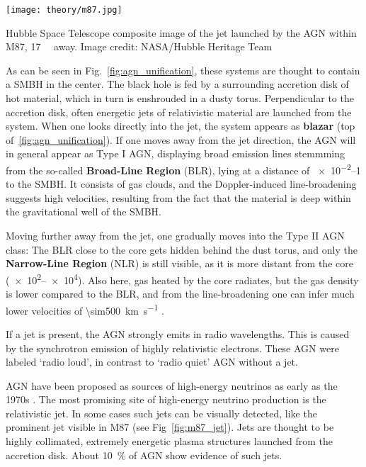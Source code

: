 \begin{marginfigure}
    \texttt{[image: theory/m87.jpg]}
    \caption[M87 jet]{Hubble Space Telescope composite image of the jet launched by the AGN within M87, \SI{17}{\mega\parsec} away. Image credit: NASA/Hubble Heritage Team}
\end{marginfigure}

As can be seen in Fig.~\ref{fig:agn_unification}, these systems are thought to contain a SMBH in the center. The black hole is fed by a surrounding accretion disk of hot material, which in turn is enshrouded in a dusty torus. Perpendicular to the accretion disk, often energetic jets of relativistic material are launched from the system. When one looks directly into the jet, the system appears as \textbf{blazar} (top of~\ref{fig:agn_unification}). If one moves away from the jet direction, the AGN will in general appear as Type I AGN, displaying broad emission lines stemmming from the so-called \textbf{Broad-Line Region} (BLR), lying at a distance of \SIrange{e-2}{1}{\parsec} to the SMBH. It consists of gas clouds, and the Doppler-induced line-broadening suggests high velocities, resulting from the fact that the material is deep within the gravitational well of the SMBH.

Moving further away from the jet, one gradually moves into the Type II AGN class: The BLR close to the core gets hidden behind the dust torus, and only the  \textbf{Narrow-Line Region} (NLR) is still visible, as it is more distant from the core (\SIrange{e2}{e4}{\parsec}). Also here, gas heated by the core radiates, but the gas density is lower compared to the BLR, and from the line-broadening one can infer much lower velocities of \SI{\sim500}{\kilo\m\per\s} .

If a jet is present, the AGN strongly emits in radio wavelengths. This is caused by the synchrotron emission of highly relativistic electrons. These AGN were labeled `radio loud', in contrast to `radio quiet' AGN without a jet.

AGN have been proposed as sources of high-energy neutrinos as early as the 1970s .
The most promising site of high-energy neutrino production is the relativistic jet. In some cases such jets can be visually detected, like the prominent jet visible in M87 (see Fig~\ref{fig:m87_jet}). Jets are thought to be highly collimated, extremely energetic plasma structures launched from the accretion disk. About \SI{10}{\percent} of AGN show evidence of such jets. 

